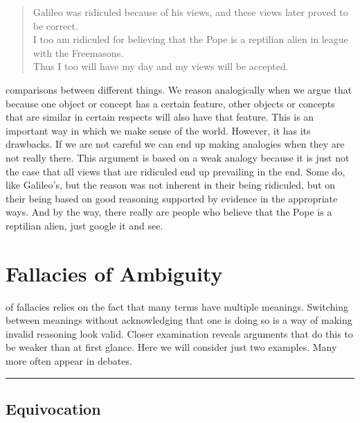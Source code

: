 \documentclass[justified]{tufte-book}
\newenvironment{argument}{\begin{quote}\normalsize}{\end{quote}}
\begin{document}
\begin{argument}
Galileo was ridiculed because of his views, and these views later proved
to be correct.\\
I too am ridiculed for believing that the Pope is a reptilian alien in
league with the Freemasons.\\
Thus I too will have my day and my views will be accepted.
\end{argument}

 comparisons between different things. We reason analogically when we argue that because one object or concept has a certain feature, other objects or concepts that are similar in certain respects will also have that feature. This is an important way in which we make sense of the world. However, it has its drawbacks. If we are not careful we can end up making analogies when they are not really there. This argument is based on a weak analogy because it is just not the case that all views that are ridiculed end up prevailing in the end. Some do, like Galileo's, but the reason was not inherent in their being ridiculed, but on their being based on good reasoning supported by evidence in the appropriate ways. And by the way, there really are people who believe that the Pope is a reptilian alien, just google it and see.

\hypertarget{fallacies-of-ambiguity}{%
\section{Fallacies of Ambiguity}\label{fallacies-of-ambiguity}}

 of fallacies relies on the fact that many terms have multiple meanings. Switching between meanings without acknowledging that one is doing so is a way of making invalid reasoning look valid. Closer examination reveals arguments that do this to be weaker than at first glance. Here we will consider just two examples. Many more often appear in debates.

\begin{center}\rule{0.5\linewidth}{\linethickness}\end{center}

\hypertarget{equivocation}{%
\subsection*{Equivocation}\label{equivocation}}
\end{document}
